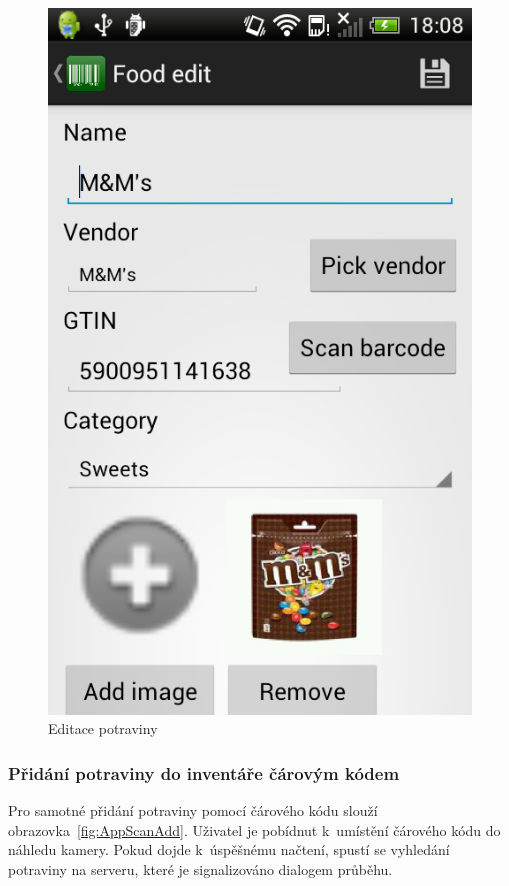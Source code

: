 \documentclass[thesis=B,czech]{FITthesis}[2013/10/20]
\begin{document}
\begin{figure}[H]
  \centering
  \includegraphics[scale=0.35]{screenshots/app_food_edit.png}
  \caption{Editace potraviny}
  \label{fig:AppFoodEdit}
\end{figure}

\clearpage

\subsubsection{Přidání potraviny do inventáře čárovým kódem}

Pro samotné přidání potraviny pomocí čárového kódu slouží obrazovka~\ref{fig:AppScanAdd}. Uživatel je pobídnut k~umístění čárového kódu do náhledu kamery. Pokud dojde k~úspěšnému načtení, spustí se vyhledání potraviny na serveru, které je signalizováno dialogem průběhu.
\end{document}
